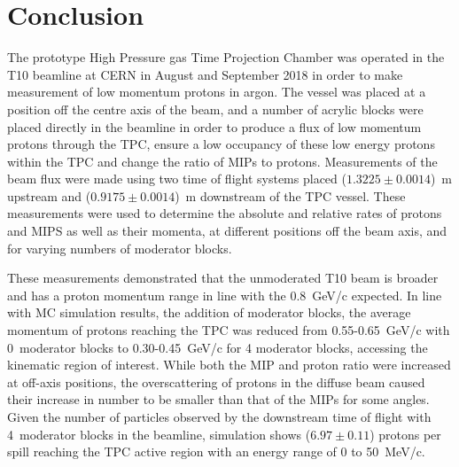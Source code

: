 \section{Conclusion}
\label{hptpcPaper:sec:Conclusion}

The prototype High Pressure gas Time Projection Chamber was operated in the T10 beamline at CERN in August and September 2018 in order to make measurement of low momentum protons in argon.
The vessel was placed at a position off the centre axis of the beam, and a number of acrylic blocks were placed directly in the beamline in order to produce a flux of low momentum protons through the TPC, ensure a low occupancy of these low energy protons within the TPC and change the ratio of MIPs to protons.
Measurements of the beam flux were made using two time of flight systems placed ($1.3225 \pm 0.0014$)~m upstream and ($0.9175 \pm 0.0014$)~m downstream of the TPC vessel.
These measurements were used to determine the absolute and relative rates of protons and MIPS as well as their momenta, at different positions off the beam axis, and for varying numbers of moderator blocks.

These measurements demonstrated that the unmoderated T10 beam is broader and has a proton momentum range in line with the 0.8~GeV/c expected.
In line with MC simulation results, the addition of moderator blocks, the average momentum of protons reaching the TPC was reduced from 0.55-0.65~GeV/c with 0~moderator blocks to 0.30-0.45~GeV/c for 4 moderator blocks, accessing the kinematic region of interest.
While both the MIP and proton ratio were increased at off-axis positions, the overscattering of protons in the diffuse beam caused their increase in number to be smaller than that of the MIPs for some angles.
Given the number of particles observed by the downstream time of flight with 4~moderator blocks in the beamline, simulation shows ($6.97 \pm  0.11$) protons per spill reaching the TPC active region with an energy range of 0 to 50~MeV/c.

